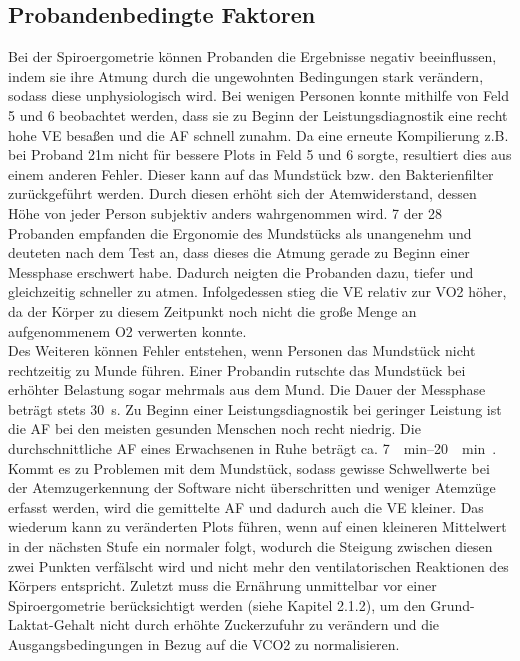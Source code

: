 \subsection{Probandenbedingte Faktoren}
%
Bei der Spiroergometrie können Probanden die Ergebnisse negativ beeinflussen, indem sie ihre Atmung durch die ungewohnten Bedingungen stark verändern, sodass diese unphysiologisch wird. Bei wenigen Personen konnte mithilfe von Feld 5 und 6 beobachtet werden, dass sie zu Beginn der Leistungsdiagnostik eine recht hohe \gls{VE} besaßen und die \gls{AF} schnell zunahm. Da eine erneute Kompilierung z.B. bei Proband 21m nicht für bessere Plots in Feld 5 und 6 sorgte, resultiert dies aus einem anderen Fehler. Dieser kann auf das Mundstück bzw. den Bakterienfilter zurückgeführt werden. Durch diesen erhöht sich der Atemwiderstand, dessen Höhe von jeder Person subjektiv anders wahrgenommen wird. 7 der 28 Probanden empfanden die Ergonomie des Mundstücks als unangenehm und deuteten nach dem Test an, dass dieses die Atmung gerade zu Beginn einer Messphase erschwert habe. Dadurch neigten die Probanden dazu, tiefer und gleichzeitig schneller zu atmen. Infolgedessen stieg die \gls{VE} relativ zur \gls{VO2} höher, da der Körper zu diesem Zeitpunkt noch nicht die große Menge an aufgenommenem \gls{O2} verwerten konnte.\\
Des Weiteren können Fehler entstehen, wenn Personen das Mundstück nicht rechtzeitig zu Munde führen. Einer Probandin rutschte das Mundstück bei erhöhter Belastung sogar mehrmals aus dem Mund. Die Dauer der Messphase beträgt stets \SI{30}{\second}. Zu Beginn einer Leistungsdiagnostik bei geringer Leistung ist die \gls{AF} bei den meisten gesunden Menschen noch recht niedrig. Die durchschnittliche \gls{AF} eines Erwachsenen in Ruhe beträgt ca. \SIrange{7}{20}{\per\minute}~\cite{Larsen.2017}. Kommt es zu Problemen mit dem Mundstück, sodass gewisse Schwellwerte bei der Atemzugerkennung der Software nicht überschritten und weniger Atemzüge erfasst werden, wird die gemittelte \gls{AF} und dadurch auch die \gls{VE} kleiner. Das wiederum kann zu veränderten Plots führen, wenn auf einen kleineren Mittelwert in der nächsten Stufe ein normaler folgt, wodurch die Steigung zwischen diesen zwei Punkten verfälscht wird und nicht mehr den ventilatorischen Reaktionen des Körpers entspricht. Zuletzt muss die Ernährung unmittelbar vor einer Spiroergometrie berücksichtigt werden (siehe Kapitel 2.1.2), um den Grund-Laktat-Gehalt nicht durch erhöhte Zuckerzufuhr zu verändern und die Ausgangsbedingungen in Bezug auf die \gls{VCO2} zu normalisieren.
%
